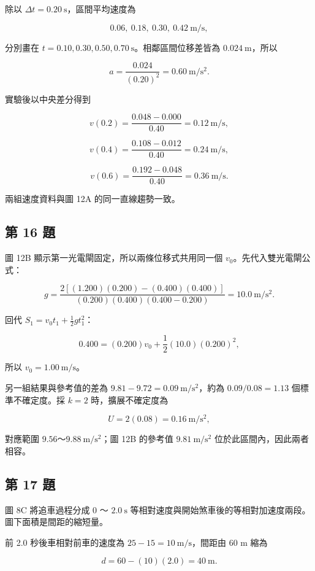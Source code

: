\documentclass[11pt,a4paper]{article}
\begin{document}
除以 \(\Delta t=0.20\ \mathrm s\)，區間平均速度為

\[
0.06,\ 0.18,\ 0.30,\ 0.42\ \mathrm{m/s},
\]

分別畫在 \(t=0.10,0.30,0.50,0.70\ \mathrm s\)。相鄰區間位移差皆為 \(0.024\ \mathrm m\)，所以

\[
a=\frac{0.024}{(0.20)^2}=0.60\ \mathrm{m/s^2}.
\]

實驗後以中央差分得到

\[
v(0.2)=\frac{0.048-0.000}{0.40}=0.12\ \mathrm{m/s},
\]

\[
v(0.4)=\frac{0.108-0.012}{0.40}=0.24\ \mathrm{m/s},
\]

\[
v(0.6)=\frac{0.192-0.048}{0.40}=0.36\ \mathrm{m/s}.
\]

兩組速度資料與圖 12A 的同一直線趨勢一致。

\subsection{第 16 題}\label{ux7b2c-16-ux984c}

圖 12B 顯示第一光電閘固定，所以兩條位移式共用同一個 \(v_0\)。先代入雙光電閘公式：

\[
g=\frac{2[(1.200)(0.200)-(0.400)(0.400)]}
{(0.200)(0.400)(0.400-0.200)}
=10.0\ \mathrm{m/s^2}.
\]

回代 \(S_1=v_0t_1+\tfrac12gt_1^2\)：

\[
0.400=(0.200)v_0+\frac12(10.0)(0.200)^2,
\]

所以 \(v_0=1.00\ \mathrm{m/s}\)。

另一組結果與參考值的差為 \(9.81-9.72=0.09\ \mathrm{m/s^2}\)，約為 \(0.09/0.08=1.13\) 個標準不確定度。採 \(k=2\) 時，擴展不確定度為

\[
U=2(0.08)=0.16\ \mathrm{m/s^2},
\]

對應範圍 \(9.56\)～\(9.88\ \mathrm{m/s^2}\)；圖 12B 的參考值 \(9.81\ \mathrm{m/s^2}\) 位於此區間內，因此兩者相容。

\subsection{第 17 題}\label{ux7b2c-17-ux984c}

圖 8C 將追車過程分成 \(0\) ～ \(2.0\ \mathrm s\) 等相對速度與開始煞車後的等相對加速度兩段。圖下面積是間距的縮短量。

前 2.0 秒後車相對前車的速度為 \(25-15=10\ \mathrm{m/s}\)，間距由 60 m 縮為

\[
d=60-(10)(2.0)=40\ \mathrm m.
\]
\end{document}
